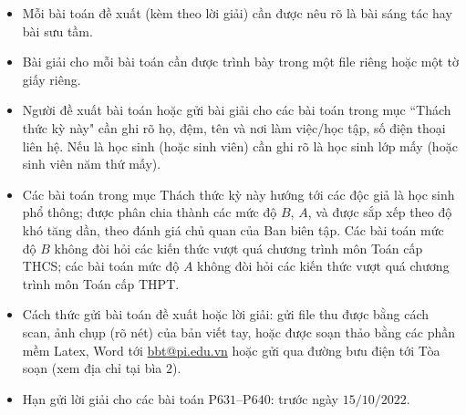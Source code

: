 \thispagestyle{thachthuctoanhocnone}
\pagestyle{thachthuctoanhoc}
\everymath{\color{thachthuctoanhoc}}
\graphicspath{{../thachthuctoanhoc/pic/}}
\begingroup
{}
\centering
\vspace*{4cm}
\endgroup
\vspace*{-8pt}
\begin{tBox}
	\begin{itemize}[leftmargin = 13pt, itemsep = 1.0pt] 
				\item Mỗi bài toán đề xuất (kèm theo lời giải) cần được nêu rõ là bài sáng tác hay bài sưu tầm.
		\item Bài giải cho mỗi bài toán cần được trình bày trong một file riêng hoặc
		một tờ giấy riêng.
		\item  Người đề xuất bài toán hoặc gửi bài giải cho các bài toán trong mục ``Thách thức kỳ này" cần ghi rõ họ, đệm, tên và nơi làm việc/học tập, số điện thoại liên hệ. Nếu là học sinh (hoặc sinh viên) cần ghi rõ là học sinh lớp mấy (hoặc sinh viên năm thứ mấy).
		\item Các bài toán trong mục Thách thức kỳ này hướng tới các độc giả là học sinh phổ thông; được phân chia thành các mức độ $B$, $A$, và được sắp xếp theo độ khó tăng dần, theo đánh giá chủ quan của Ban biên tập. Các bài toán mức độ $B$ không đòi hỏi các kiến thức vượt quá chương trình môn Toán cấp THCS; các bài toán mức độ $A$ không đòi hỏi các kiến thức vượt quá chương trình môn Toán cấp THPT.
		\item Cách thức gửi bài toán đề xuất hoặc lời giải: gửi file thu được bằng cách scan, ảnh chụp (rõ nét) của bản viết tay, hoặc được soạn thảo bằng các phần mềm Latex, Word tới \url{bbt@pi.edu.vn} hoặc gửi qua đường bưu điện tới Tòa soạn (xem địa chỉ tại bìa $2$).
		\item Hạn gửi lời giải cho các bài toán P$631$--P$640$: trước ngày $15/10/2022$.
	\end{itemize}
\end{tBox}
